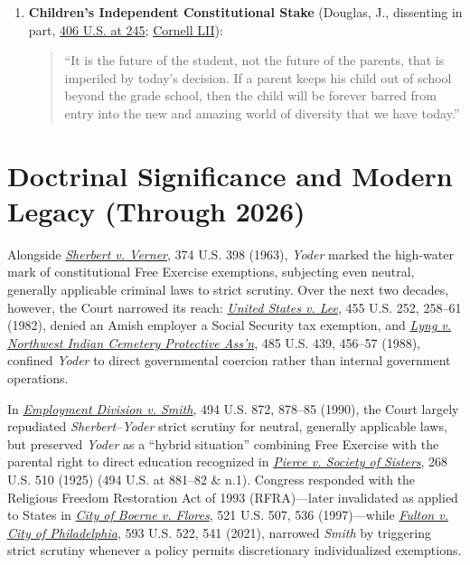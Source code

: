 \documentclass[12pt]{article}
\begin{document}
\begin{enumerate}
  \item \textbf{Children's Independent Constitutional Stake} (Douglas, J., dissenting in part, \href{https://supreme.justia.com/cases/federal/us/406/205/}{406 U.S. at 245}; \href{https://www.law.cornell.edu/supremecourt/text/406/205}{Cornell LII}):
  \begin{quote}
    ``It is the future of the student, not the future of the parents, that is imperiled by today's decision. If a parent keeps his child out of school beyond the grade school, then the child will be forever barred from entry into the new and amazing world of diversity that we have today.''
  \end{quote}
\end{enumerate}

\section{Doctrinal Significance and Modern Legacy (Through 2026)}

Alongside \href{https://supreme.justia.com/cases/federal/us/374/398/}{\emph{Sherbert v. Verner}}, 374 U.S. 398 (1963), \emph{Yoder} marked the high-water mark of constitutional Free Exercise exemptions, subjecting even neutral, generally applicable criminal laws to strict scrutiny. Over the next two decades, however, the Court narrowed its reach: \href{https://supreme.justia.com/cases/federal/us/455/252/}{\emph{United States v. Lee}}, 455 U.S. 252, 258--61 (1982), denied an Amish employer a Social Security tax exemption, and \href{https://supreme.justia.com/cases/federal/us/485/439/}{\emph{Lyng v. Northwest Indian Cemetery Protective Ass'n}}, 485 U.S. 439, 456--57 (1988), confined \emph{Yoder} to direct governmental coercion rather than internal government operations.

In \href{https://supreme.justia.com/cases/federal/us/494/872/}{\emph{Employment Division v. Smith}}, 494 U.S. 872, 878--85 (1990), the Court largely repudiated \emph{Sherbert}--\emph{Yoder} strict scrutiny for neutral, generally applicable laws, but preserved \emph{Yoder} as a ``hybrid situation'' combining Free Exercise with the parental right to direct education recognized in \href{https://supreme.justia.com/cases/federal/us/268/510/}{\emph{Pierce v. Society of Sisters}}, 268 U.S. 510 (1925) (494 U.S. at 881--82 \& n.1). Congress responded with the Religious Freedom Restoration Act of 1993 (RFRA)---later invalidated as applied to States in \href{https://supreme.justia.com/cases/federal/us/521/507/}{\emph{City of Boerne v. Flores}}, 521 U.S. 507, 536 (1997)---while \href{https://www.law.cornell.edu/supremecourt/text/19-123}{\emph{Fulton v. City of Philadelphia}}, 593 U.S. 522, 541 (2021), narrowed \emph{Smith} by triggering strict scrutiny whenever a policy permits discretionary individualized exemptions.
\end{document}
